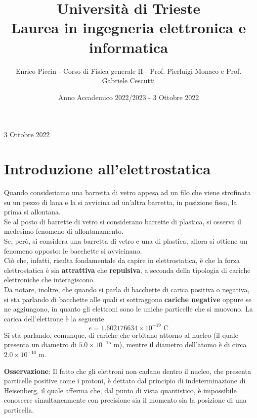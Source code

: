 \documentclass[a4paper]{extarticle}
\title{\textbf{Università di Trieste\\ \vspace{1em}
Laurea in ingegneria elettronica e informatica}}
\author{Enrico Piccin - Corso di Fisica generale II - Prof. Pierluigi Monaco e Prof. Gabriele Cescutti}
\date{Anno Accademico 2022/2023 - 3 Ottobre 2022}
\begin{document}
\vspace{-10mm}
\noindent
\maketitle

\tableofcontents
\newpage

\noindent
\begin{center}
  3 Ottobre 2022
\end{center}

\section{Introduzione all'elettrostatica}
Quando consideriamo una barretta di vetro appesa ad un filo che viene strofinata su un pezzo di lana e la si avvicina ad un'altra barretta, in posizione fissa, la prima si allontana.\\
Se al posto di barrette di vetro si considerano barrette di plastica, si osserva il medesimo fenomeno di allontanamento.\\
Se, però, si considera una barretta di vetro e una di plastica, allora si ottiene un fenomeno opposto: le bacchette si avvicinano.\\
Ciò che, infatti, risulta fondamentale da capire in elettrostatica, è che la forza elettrostatica è sia \textbf{attrattiva} che \textbf{repulsiva}, a seconda della tipologia di cariche elettroniche che interagiscono.\\
Da notare, inoltre, che quando si parla di bacchette di carica positiva o negativa, si sta parlando di bacchette alle quali si sottraggono \textbf{cariche negative} oppure se ne aggiungono, in quanto gli elettroni sono le uniche particelle che si muovono.
La carica dell'elettrone è la seguente
\[\boxed{e = 1.602176634 \times 10^{-19} \text{ C}}\]
Si sta parlando, comunque, di cariche che orbitano attorno al nucleo (il quale presenta un diametro di $5.0 \times 10^{-15} \text{ m}$), mentre il diametro dell'atomo è di circa $2.0 \times 10^{-10} \text{ m}$.

\vspace{1em}
\noindent
\textbf{Osservazione}: Il fatto che gli elettroni non cadano dentro il nucleo, che presenta particelle positive come i protoni, è dettato dal principio di indeterminazione di Heisenberg, il quale afferma che, dal punto di vista quantistico, è impossibile conoscere simultaneamente con precisione sia il momento sia la posizione di una particella.

\vspace{1em}
\end{document}
